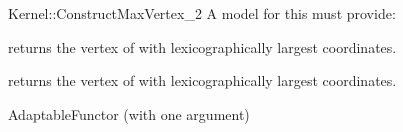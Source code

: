 \begin{ccRefFunctionObjectConcept}{Kernel::ConstructMaxVertex_2}
A model for this must provide:


 {returns the vertex of
   with lexicographically largest coordinates.}

 {returns the vertex of
   with lexicographically largest coordinates.}

\ccRefines
AdaptableFunctor (with one argument)

\ccSeeAlso
{}\\

\end{ccRefFunctionObjectConcept}
